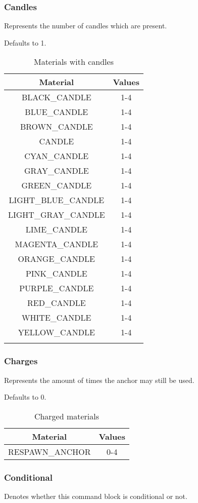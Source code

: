 \subsubsection{Candles}
Represents the number of candles which are present.

Defaults to 1.

\begin{longtable}{ |c|c| }
	\hline
	Material & Values \\
	\hline
	\endhead
	BLACK\_CANDLE & 1-4 \\
	BLUE\_CANDLE & 1-4 \\
	BROWN\_CANDLE & 1-4 \\
	CANDLE & 1-4 \\
	CYAN\_CANDLE & 1-4 \\
	GRAY\_CANDLE & 1-4 \\
	GREEN\_CANDLE & 1-4 \\
	LIGHT\_BLUE\_CANDLE & 1-4 \\
	LIGHT\_GRAY\_CANDLE & 1-4 \\
	LIME\_CANDLE & 1-4 \\
	MAGENTA\_CANDLE & 1-4 \\
	ORANGE\_CANDLE & 1-4 \\
	PINK\_CANDLE & 1-4 \\
	PURPLE\_CANDLE & 1-4 \\
	RED\_CANDLE & 1-4 \\
	WHITE\_CANDLE & 1-4 \\
	YELLOW\_CANDLE & 1-4 \\
	\hline
	\caption{Materials with candles}
\end{longtable}

\subsubsection{Charges}
Represents the amount of times the anchor may still be used.

Defaults to 0.

\begin{table}[H]
	\centering
	\begin{tabular}{ |c|c| }
		\hline
		Material & Values \\
		\hline
		RESPAWN\_ANCHOR & 0-4 \\
		\hline
	\end{tabular}
	\caption{Charged materials}
\end{table}

\subsubsection{Conditional}
Denotes whether this command block is conditional or not.

